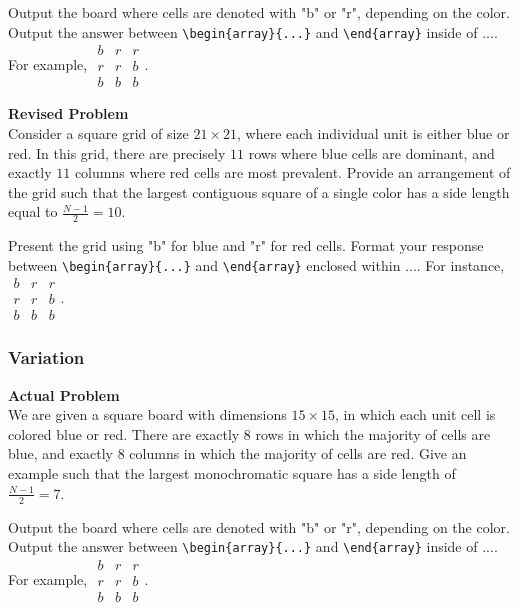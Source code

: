 Output the board where cells are denoted with "b" or "r", depending on the color. Output the answer between \verb|\begin{array}{...}| and \verb|\end{array}| inside of $\boxed{...}$. For example, $\boxed{\begin{array}{ccc}b & r & r \\ r & r & b \\ b & b & b\end{array}}$.

\textbf{Revised Problem}\\
Consider a square grid of size $21\times 21$, where each individual unit is either blue or red. In this grid, there are precisely $11$ rows where blue cells are dominant, and exactly $11$ columns where red cells are most prevalent. Provide an arrangement of the grid such that the largest contiguous square of a single color has a side length equal to $\frac{N-1}{2}=10$.

Present the grid using "b" for blue and "r" for red cells. Format your response between \verb|\begin{array}{...}| and \verb|\end{array}| enclosed within $\boxed{...}$. For instance, $\boxed{\begin{array}{ccc}b & r & r \\ r & r & b \\ b & b & b\end{array}}$.

\subsubsection{Variation}
\textbf{Actual Problem}\\
We are given a square board with dimensions $15\times 15$, in which each unit cell is colored blue or red. There are exactly $8$ rows in which the majority of cells are blue, and exactly $8$ columns in which the majority of cells are red.  Give an example such that the largest monochromatic square has a side length of $\frac{N-1}{2}=7$.

Output the board where cells are denoted with "b" or "r", depending on the color. Output the answer between \verb|\begin{array}{...}| and \verb|\end{array}| inside of $\boxed{...}$. For example, $\boxed{\begin{array}{ccc}b & r & r \\ r & r & b \\ b & b & b\end{array}}$.

